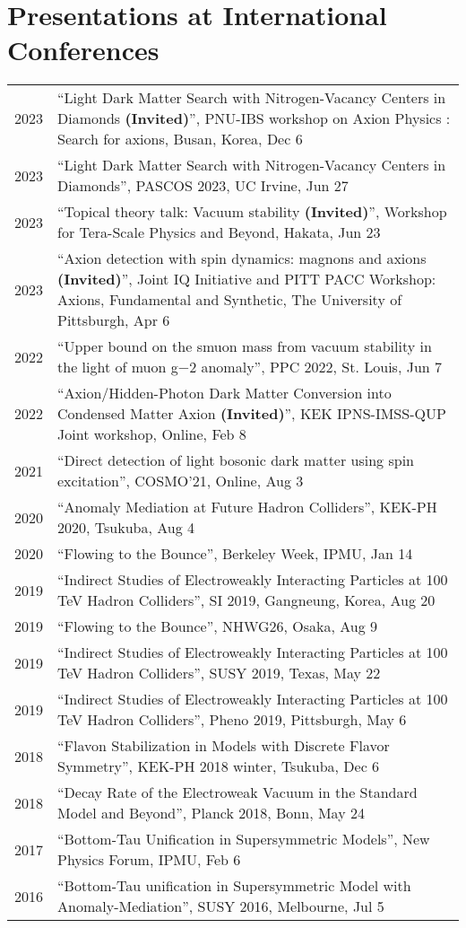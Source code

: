 \documentclass[12pt]{article}
\begin{document}
\section*{Presentations at International Conferences}
\begin{table}[H]\begin{tabular}{lp{6in}}2023 & ``Light Dark Matter Search with Nitrogen-Vacancy Centers in Diamonds \textbf{(Invited)}'', PNU-IBS workshop on Axion Physics : Search for axions, Busan, Korea, Dec 6 \\2023 & ``Light Dark Matter Search with Nitrogen-Vacancy Centers in Diamonds'', PASCOS 2023, UC Irvine, Jun 27 \\2023 & ``Topical theory talk: Vacuum stability \textbf{(Invited)}'', Workshop for Tera-Scale Physics and Beyond, Hakata, Jun 23 \\2023 & ``Axion detection with spin dynamics: magnons and axions \textbf{(Invited)}'', Joint IQ Initiative and PITT PACC Workshop: Axions, Fundamental and Synthetic, The University of Pittsburgh, Apr 6 \\2022 & ``Upper bound on the smuon mass from vacuum stability in the light of muon g−2 anomaly'', PPC 2022, St. Louis, Jun 7 \\2022 & ``Axion/Hidden-Photon Dark Matter Conversion into Condensed Matter Axion \textbf{(Invited)}'', KEK IPNS-IMSS-QUP Joint workshop, Online, Feb 8 \\2021 & ``Direct detection of light bosonic dark matter using spin excitation'', COSMO'21, Online, Aug 3 \\2020 & ``Anomaly Mediation at Future Hadron Colliders'', KEK-PH 2020, Tsukuba, Aug 4 \\2020 & ``Flowing to the Bounce'', Berkeley Week, IPMU, Jan 14 \\2019 & ``Indirect Studies of Electroweakly Interacting Particles at 100 TeV Hadron Colliders'', SI 2019, Gangneung, Korea, Aug 20 \\2019 & ``Flowing to the Bounce'', NHWG26, Osaka, Aug 9 \\2019 & ``Indirect Studies of Electroweakly Interacting Particles at 100 TeV Hadron Colliders'', SUSY 2019, Texas, May 22 \\2019 & ``Indirect Studies of Electroweakly Interacting Particles at 100 TeV Hadron Colliders'', Pheno 2019, Pittsburgh, May 6 \\2018 & ``Flavon Stabilization in Models with Discrete Flavor Symmetry'', KEK-PH 2018 winter, Tsukuba, Dec 6 \\2018 & ``Decay Rate of the Electroweak Vacuum in the Standard Model and Beyond'', Planck 2018, Bonn, May 24 \\2017 & ``Bottom-Tau Unification in Supersymmetric Models'', New Physics Forum, IPMU, Feb 6 \\2016 & ``Bottom-Tau unification in Supersymmetric Model with Anomaly-Mediation'', SUSY 2016, Melbourne, Jul 5 \\\end{tabular}\end{table}
\end{document}
